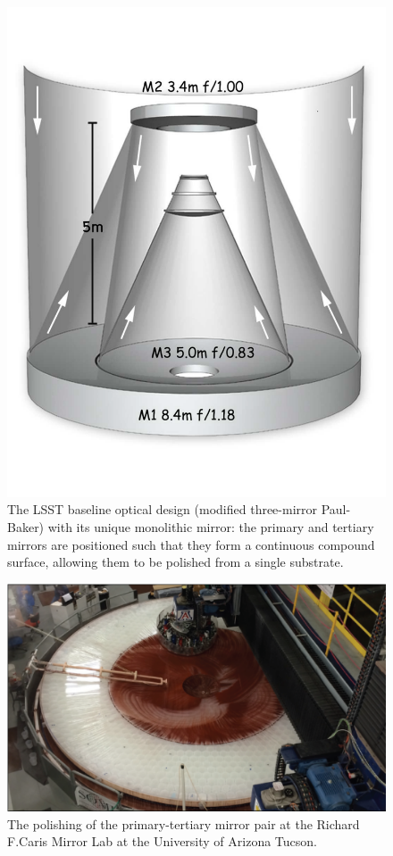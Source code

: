 \begin{figure}
\vskip -0.5in
\includegraphics[width=1.0\hsize,clip]{mirrors.pdf}
\vskip -0.5in
\caption{The LSST baseline optical design (modified three-mirror
  Paul-Baker) with its unique
monolithic mirror: the primary and tertiary mirrors are positioned such
that they form a continuous compound surface, allowing them to be polished
from a single substrate.}
\label{Fig:optics}
\end{figure}


\begin{figure}
\includegraphics[width=1.0\hsize,clip]{polishing.pdf}
\caption{The polishing of the primary-tertiary mirror pair at the Richard F.Caris Mirror Lab at the University of Arizona Tucson. }
\label{Fig:polishing}
\end{figure}





